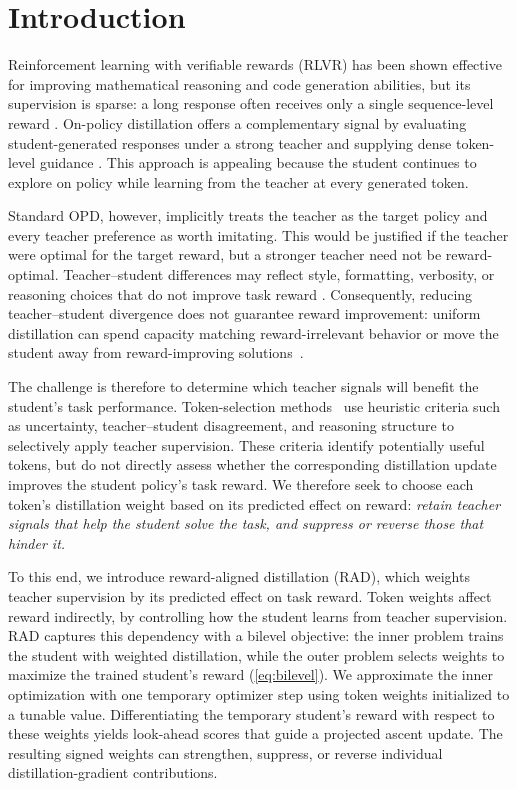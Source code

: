 \documentclass{article} %
\begin{document}
\section{Introduction}

Reinforcement learning with verifiable rewards (RLVR) has been shown effective for improving
mathematical reasoning \citep{IMO2025} and code generation \citep{jaech2024openai, ekbote2025murphy} abilities,
but its supervision is sparse: a long response often
receives only a single sequence-level reward
\citep{shao2024deepseekmath,guo2025deepseek}. On-policy distillation offers a
complementary signal by evaluating student-generated responses under a
strong teacher and supplying dense token-level guidance
\citep{agarwal2024policy, gu2024minillm}. This approach is
appealing because the student continues to explore on policy while learning
from the teacher at every generated token.

Standard OPD, however, implicitly treats the teacher as the target policy and
every teacher preference as worth imitating. This would be justified if the
teacher were optimal for the target reward, but a stronger teacher need not be
reward-optimal. Teacher--student differences may reflect style, formatting,
verbosity, or reasoning choices that do not improve task reward \citep{armandpour2026unmasking}. Consequently,
reducing teacher--student divergence does not guarantee reward improvement:
uniform distillation can spend capacity matching reward-irrelevant behavior or
move the student away from reward-improving solutions~\citep{xu2026tip,rgopd}.

The challenge is therefore to determine which teacher signals will benefit the student’s task performance. Token-selection methods~\citep{xu2026tip,xiao2026finding} use heuristic criteria such as uncertainty, teacher--student disagreement, and reasoning structure to selectively apply teacher supervision. These criteria identify potentially useful tokens, but do not directly assess whether the corresponding distillation update improves the student policy's task reward. We therefore seek to choose each token’s distillation weight based on its predicted effect on reward: \emph{retain teacher signals that help the student solve the task, and suppress or reverse those that hinder it.}

To this end, we introduce reward-aligned distillation (RAD), which weights teacher supervision by its predicted effect on task reward. Token weights affect reward indirectly, by controlling how the student learns from teacher supervision. RAD captures this dependency with a bilevel objective: the inner problem trains the student with weighted distillation, while the outer problem selects weights to maximize the trained student's reward (\autoref{eq:bilevel}). We approximate the inner optimization with one temporary optimizer step using token weights initialized to a tunable value. Differentiating the temporary student's reward with respect to these weights yields look-ahead scores that guide a projected ascent update. The resulting signed weights can strengthen, suppress, or reverse individual distillation-gradient contributions.
\end{document}
